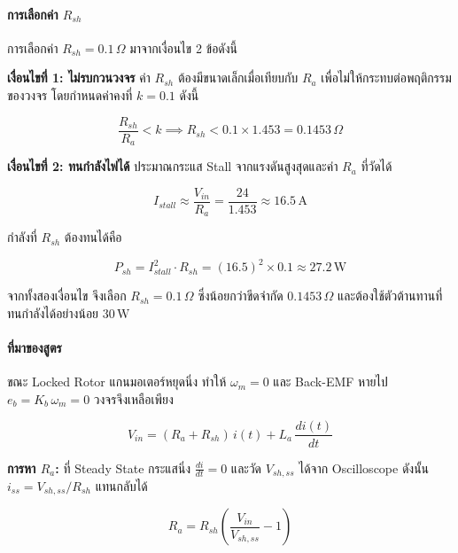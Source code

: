 \paragraph{การเลือกค่า $R_{sh}$}

การเลือกค่า $R_{sh} = 0.1\,\Omega$ มาจากเงื่อนไข 2 ข้อดังนี้

\textbf{เงื่อนไขที่ 1: ไม่รบกวนวงจร}
ค่า $R_{sh}$ ต้องมีขนาดเล็กเมื่อเทียบกับ $R_a$ เพื่อไม่ให้กระทบต่อพฤติกรรมของวงจร
โดยกำหนดค่าคงที่ $k = 0.1$ ดังนี้

\begin{equation}
  \frac{R_{sh}}{R_a} < k \implies R_{sh} < 0.1 \times 1.453 = 0.1453\,\Omega
  \label{eq:rsh_condition1}
\end{equation}

\textbf{เงื่อนไขที่ 2: ทนกำลังไฟได้}
ประมาณกระแส Stall จากแรงดันสูงสุดและค่า $R_a$ ที่วัดได้

\begin{equation}
  I_{stall} \approx \frac{V_{in}}{R_a} = \frac{24}{1.453} \approx 16.5\,\text{A}
  \label{eq:i_stall}
\end{equation}

กำลังที่ $R_{sh}$ ต้องทนได้คือ

\begin{equation}
  P_{sh} = I_{stall}^2 \cdot R_{sh} = (16.5)^2 \times 0.1 \approx 27.2\,\text{W}
  \label{eq:p_sh}
\end{equation}

จากทั้งสองเงื่อนไข จึงเลือก $R_{sh} = 0.1\,\Omega$ 
ซึ่งน้อยกว่าขีดจำกัด $0.1453\,\Omega$ และต้องใช้ตัวต้านทานที่ทนกำลังได้อย่างน้อย $30\,\text{W}$

\paragraph{ที่มาของสูตร}

ขณะ Locked Rotor แกนมอเตอร์หยุดนิ่ง ทำให้ $\omega_m = 0$ 
และ Back-EMF หายไป $e_b = K_b\,\omega_m = 0$ วงจรจึงเหลือเพียง

\begin{equation}
  V_{in} = (R_a + R_{sh})\,i(t) + L_a\,\frac{di(t)}{dt}
  \label{eq:locked_rotor_circuit}
\end{equation}

\textbf{การหา $R_a$:}
ที่ Steady State กระแสนิ่ง $\frac{di}{dt} = 0$ และวัด $V_{sh,ss}$ ได้จาก Oscilloscope
ดังนั้น $i_{ss} = V_{sh,ss}/R_{sh}$ แทนกลับได้

\begin{equation}
  R_a = R_{sh}\left(\frac{V_{in}}{V_{sh,ss}} - 1\right)
  \label{eq:Ra_derive}
\end{equation}

